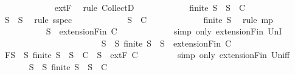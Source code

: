 \begin{isabellebody}
\ \ \ \ \ \ \ \ \ \ \ \isamarkupfalse%
\ extF\ \isamarkupfalse%
\ {\isacharparenleft}rule\ CollectD{\isacharparenright}\isanewline
\ \ \ \ \ \ \ \ \ \isamarkupfalse%
\ \isamarkupfalse%
\ {\isachardoublequoteopen}finite\ S{\isacharprime}\ {\isasymlongrightarrow}\ S{\isacharprime}\ {\isasymin}\ C{\isachardoublequoteclose}\isanewline
\ \ \ \ \ \ \ \ \ \ \ \isamarkupfalse%
\ {\isacartoucheopen}S{\isacharprime}\ {\isasymsubseteq}\ S{\isacartoucheclose}\ \isamarkupfalse%
\ {\isacharparenleft}rule\ sspec{\isacharparenright}\isanewline
\ \ \ \ \ \ \ \ \ \isamarkupfalse%
\ \isamarkupfalse%
\ {\isachardoublequoteopen}S{\isacharprime}\ {\isasymin}\ C{\isachardoublequoteclose}\isanewline
\ \ \ \ \ \ \ \ \ \ \ \isamarkupfalse%
\ {\isacartoucheopen}finite\ S{\isacharprime}{\isacartoucheclose}\ \isamarkupfalse%
\ {\isacharparenleft}rule\ mp{\isacharparenright}\isanewline
\ \ \ \ \ \ \ \ \ \isamarkupfalse%
\ {\isachardoublequoteopen}S{\isacharprime}\ {\isasymin}\ {\isacharparenleft}extensionFin\ C{\isacharparenright}{\isachardoublequoteclose}\isanewline
\ \ \ \ \ \ \ \ \ \ \ \isamarkupfalse%
\ {\isacharparenleft}simp\ only{\isacharcolon}\ extensionFin\ UnI{}{\isacharparenright}\isanewline
\ \ \ \ \ \ \ \isamarkupfalse%
\isanewline
\ \ \ \ \ \isamarkupfalse%
\isanewline
\ \ \ \isamarkupfalse%
\isanewline
\ \ \ \ \ \isamarkupfalse%
\ {\isachardoublequoteopen}{\isasymforall}S{\isacharprime}\ {\isasymsubseteq}\ S{\isachardot}\ finite\ S{\isacharprime}\ {\isasymlongrightarrow}\ S{\isacharprime}\ {\isasymin}\ {\isacharparenleft}extensionFin\ C{\isacharparenright}{\isachardoublequoteclose}\isanewline
\ \ \ \ \ \isamarkupfalse%
\ \isamarkupfalse%
\ F{\isacharcolon}{\isachardoublequoteopen}{\isasymforall}S{\isacharprime}\ {\isasymsubseteq}\ S{\isachardot}\ finite\ S{\isacharprime}\ {\isasymlongrightarrow}\ S{\isacharprime}\ {\isasymin}\ C\ {\isasymor}\ S{\isacharprime}\ {\isasymin}\ {\isacharparenleft}extF\ C{\isacharparenright}{\isachardoublequoteclose}\isanewline
\ \ \ \ \ \ \ \isamarkupfalse%
\ {\isacharparenleft}simp\ only{\isacharcolon}\ extensionFin\ Un{\isacharunderscore}iff{\isacharparenright}\isanewline
\ \ \ \ \ \isamarkupfalse%
\ {\isachardoublequoteopen}{\isasymforall}S{\isacharprime}\ {\isasymsubseteq}\ S{\isachardot}\ finite\ S{\isacharprime}\ {\isasymlongrightarrow}\ S{\isacharprime}\ {\isasymin}\ C{\isachardoublequoteclose}\isanewline

\end{isabellebody}
